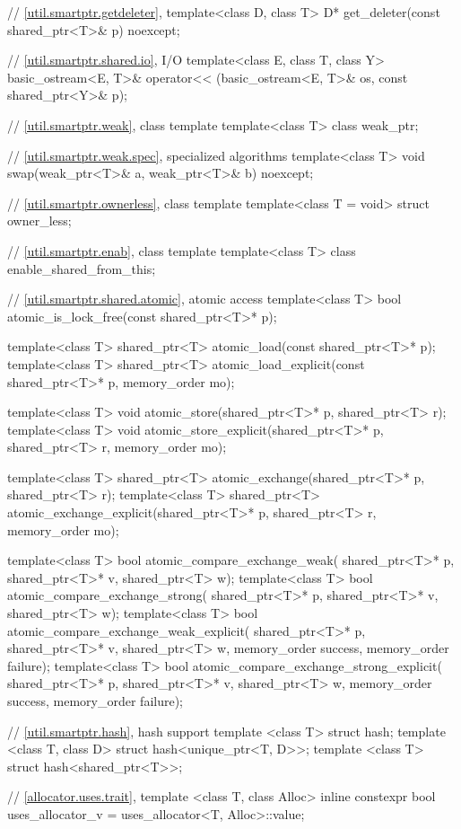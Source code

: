 \begin{codeblock}
{  // \ref{util.smartptr.getdeleter},  
  template<class D, class T>
    D* get_deleter(const shared_ptr<T>& p) noexcept;

  // \ref{util.smartptr.shared.io},  I/O
  template<class E, class T, class Y>
    basic_ostream<E, T>& operator<< (basic_ostream<E, T>& os, const shared_ptr<Y>& p);

  // \ref{util.smartptr.weak}, class template 
  template<class T> class weak_ptr;

  // \ref{util.smartptr.weak.spec},  specialized algorithms
  template<class T> void swap(weak_ptr<T>& a, weak_ptr<T>& b) noexcept;

  // \ref{util.smartptr.ownerless}, class template 
  template<class T = void> struct owner_less;

  // \ref{util.smartptr.enab}, class template 
  template<class T> class enable_shared_from_this;

  // \ref{util.smartptr.shared.atomic},  atomic access
  template<class T>
    bool atomic_is_lock_free(const shared_ptr<T>* p);

  template<class T>
    shared_ptr<T> atomic_load(const shared_ptr<T>* p);
  template<class T>
    shared_ptr<T> atomic_load_explicit(const shared_ptr<T>* p, memory_order mo);

  template<class T>
    void atomic_store(shared_ptr<T>* p, shared_ptr<T> r);
  template<class T>
    void atomic_store_explicit(shared_ptr<T>* p, shared_ptr<T> r, memory_order mo);

  template<class T>
    shared_ptr<T> atomic_exchange(shared_ptr<T>* p, shared_ptr<T> r);
  template<class T>
    shared_ptr<T> atomic_exchange_explicit(shared_ptr<T>* p, shared_ptr<T> r, memory_order mo);

  template<class T>
    bool atomic_compare_exchange_weak(
      shared_ptr<T>* p, shared_ptr<T>* v, shared_ptr<T> w);
  template<class T>
    bool atomic_compare_exchange_strong(
      shared_ptr<T>* p, shared_ptr<T>* v, shared_ptr<T> w);
  template<class T>
    bool atomic_compare_exchange_weak_explicit(
      shared_ptr<T>* p, shared_ptr<T>* v, shared_ptr<T> w,
      memory_order success, memory_order failure);
  template<class T>
    bool atomic_compare_exchange_strong_explicit(
      shared_ptr<T>* p, shared_ptr<T>* v, shared_ptr<T> w,
      memory_order success, memory_order failure);

  // \ref{util.smartptr.hash}, hash support
  template <class T> struct hash;
  template <class T, class D> struct hash<unique_ptr<T, D>>;
  template <class T> struct hash<shared_ptr<T>>;

  // \ref{allocator.uses.trait}, 
  template <class T, class Alloc>
    inline constexpr bool uses_allocator_v = uses_allocator<T, Alloc>::value;
}
\end{codeblock}

